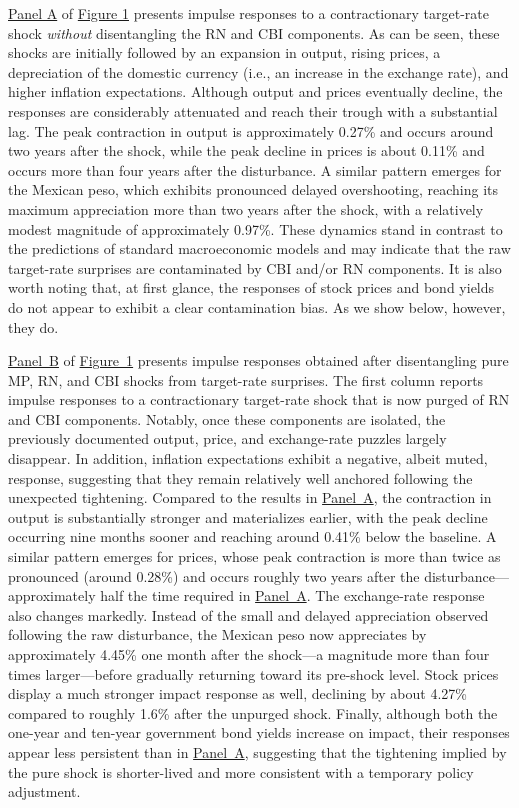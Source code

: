 \documentclass[12pt, reqno]{article}
\begin{document}
\hyperlink{Panel BF1}{Panel A} of \hyperlink{Figure 1}{Figure 1} presents impulse responses to a contractionary target-rate shock \emph{without} disentangling the RN and CBI components.  As can be seen, these shocks are initially followed by an expansion in output, rising prices, a depreciation of the domestic currency (i.e., an increase in the exchange rate), and higher inflation expectations. Although output and prices eventually decline, the responses are considerably attenuated and reach their trough with a substantial lag. The peak contraction in output is approximately 0.27\% and occurs around two years after the shock, while the peak decline in prices is about 0.11\% and occurs more than four years after the disturbance. A similar pattern emerges for the Mexican peso, which exhibits pronounced delayed overshooting, reaching its maximum appreciation more than two years after the shock, with a relatively modest magnitude of approximately 0.97\%. These dynamics stand in contrast to the predictions of standard macroeconomic models and may indicate that the raw target-rate surprises are contaminated by CBI and/or RN components. It is also worth noting that, at first glance, the responses of stock prices and bond yields do not appear to exhibit a clear contamination bias. As we show below, however, they do.

\hyperlink{Panel BF1}{Panel~B} of \hyperlink{Figure~1}{Figure~1} presents impulse responses obtained after disentangling pure MP, RN, and CBI shocks from target-rate surprises. The first column reports impulse responses to a contractionary target-rate shock that is now purged of RN and CBI components. Notably, once these components are isolated, the previously documented output, price, and exchange-rate puzzles largely disappear. In addition, inflation expectations exhibit a negative, albeit muted, response, suggesting that they remain relatively well anchored following the unexpected tightening. Compared to the results in \hyperlink{Panel BF1}{Panel~A}, the contraction in output is substantially stronger and materializes earlier, with the peak decline occurring nine months sooner and reaching around 0.41\% below the baseline. A similar pattern emerges for prices, whose peak contraction is more than twice as pronounced (around 0.28\%) and occurs roughly two years after the disturbance—approximately half the time required in \hyperlink{Panel BF1}{Panel~A}. The exchange-rate response also changes markedly. Instead of the small and delayed appreciation observed following the raw disturbance, the Mexican peso now appreciates by approximately 4.45\% one month after the shock—a magnitude more than four times larger—before gradually returning toward its pre-shock level. Stock prices display a much stronger impact response as well, declining by about 4.27\% compared to roughly 1.6\% after the unpurged shock. Finally, although both the one-year and ten-year government bond yields increase on impact, their responses appear less persistent than in \hyperlink{Panel BF1}{Panel~A}, suggesting that the tightening implied by the pure shock is shorter-lived and more consistent with a temporary policy adjustment.
\end{document}
